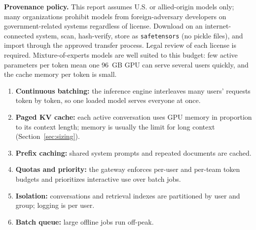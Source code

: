 \textbf{Provenance policy.} This report assumes U.S. or allied-origin models
only; many organizations prohibit models from foreign-adversary developers on
government-related systems regardless of license. Download on an internet-connected
system, scan, hash-verify, store as \texttt{safetensors} (no pickle files), and
import through the approved transfer process. Legal review of each license is
required. Mixture-of-experts models are well suited to this budget: few active
parameters per token mean one 96~GB GPU can serve several users quickly, and
the cache memory per token is small.

\begin{enumerate}
  \item \textbf{Continuous batching:} the inference engine interleaves many users'
    requests token by token, so one loaded model serves everyone at once.
  \item \textbf{Paged KV cache:} each active conversation uses GPU memory in
    proportion to its context length; memory is usually the limit for long
    context (Section~\ref{sec:sizing}).
  \item \textbf{Prefix caching:} shared system prompts and repeated documents are cached.
  \item \textbf{Quotas and priority:} the gateway enforces per-user and per-team token
    budgets and prioritizes interactive use over batch jobs.
  \item \textbf{Isolation:} conversations and retrieval indexes are partitioned by
    user and group; logging is per user.
  \item \textbf{Batch queue:} large offline jobs run off-peak.
\end{enumerate}


